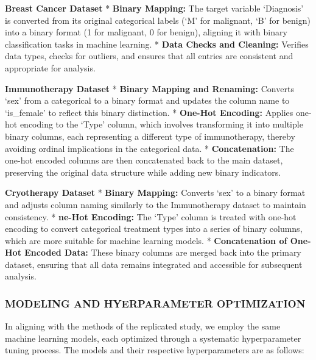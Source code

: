 \documentclass[11pt]{article}
\begin{document}
\textbf{Breast Cancer Dataset} * \textbf{Binary Mapping:} The target
variable `Diagnosis' is converted from its original categorical labels
(`M' for malignant, `B' for benign) into a binary format (1 for
malignant, 0 for benign), aligning it with binary classification tasks
in machine learning. * \textbf{Data Checks and Cleaning:} Verifies data
types, checks for outliers, and ensures that all entries are consistent
and appropriate for analysis.

\textbf{Immunotherapy Dataset} * \textbf{Binary Mapping and Renaming:}
Converts `sex' from a categorical to a binary format and updates the
column name to `is\_female' to reflect this binary distinction. *
\textbf{One-Hot Encoding:} Applies one-hot encoding to the `Type'
column, which involves transforming it into multiple binary columns,
each representing a different type of immunotherapy, thereby avoiding
ordinal implications in the categorical data. * \textbf{Concatenation:}
The one-hot encoded columns are then concatenated back to the main
dataset, preserving the original data structure while adding new binary
indicators.

\textbf{Cryotherapy Dataset} * \textbf{Binary Mapping:} Converts `sex'
to a binary format and adjusts column naming similarly to the
Immunotherapy dataset to maintain consistency. * \textbf{ne-Hot
Encoding:} The `Type' column is treated with one-hot encoding to convert
categorical treatment types into a series of binary columns, which are
more suitable for machine learning models. * \textbf{Concatenation of
One-Hot Encoded Data:} These binary columns are merged back into the
primary dataset, ensuring that all data remains integrated and
accessible for subsequent analysis.

    \hypertarget{modeling-and-hyerparameter-optimization}{%
\subsubsection{MODELING AND HYERPARAMETER
OPTIMIZATION}\label{modeling-and-hyerparameter-optimization}}

    In aligning with the methods of the replicated study, we employ the same
machine learning models, each optimized through a systematic
hyperparameter tuning process. The models and their respective
hyperparameters are as follows:
\end{document}
